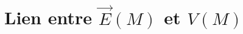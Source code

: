 \documentclass[french]{yLectureNote}
\renewcommand{\vec}{\overrightarrow}
\newcommand{\E}{\vec{E}(M)}
\newcommand{\V}{V(M)}
\newcommand{\ep}{\vec{e_{\varphi}}}
\newcommand{\pip}{\pi^+}
\begin{document}
%
%
%
%
%
%
%
\section{Lien entre \(\E\) et \(\V\)}
\end{document}
